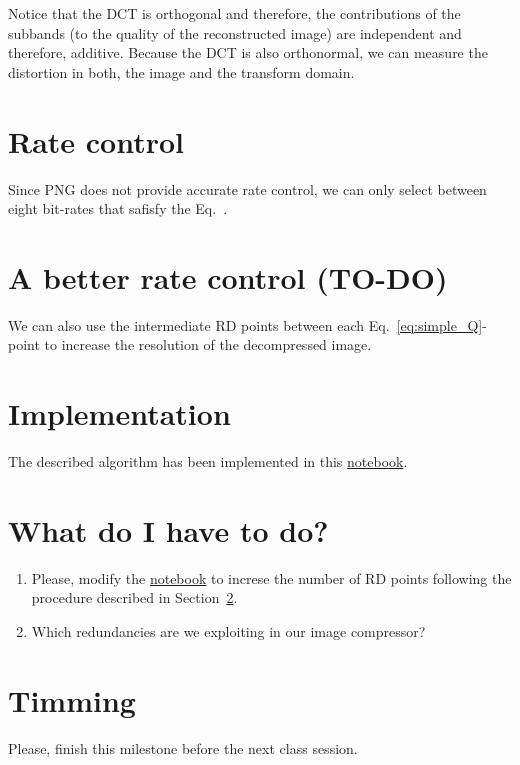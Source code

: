 Notice that the DCT is orthogonal and therefore, the contributions of
the subbands (to the quality of the reconstructed image) are
independent and therefore, additive. Because the DCT is also
orthonormal, we can measure the distortion in both, the image and the
transform domain.

\section{Rate control}
Since PNG does not provide accurate rate control, we can only select
between eight bit-rates that safisfy the Eq.~.

\section{A better rate control (TO-DO)}
\label{sec:increasing}
We can also use the intermediate RD points between each
Eq.~\eqref{eq:simple_Q}-point to increase the resolution of the
decompressed image.

\section{Implementation}
The described algorithm has been implemented in this
\href{https://github.com/Sistemas-Multimedia/Sistemas-Multimedia.github.io/blob/master/contents/RGB_DCT_SQ/RGB_DCT_SQ.ipynb}{notebook}.

\section{What do I have to do?}

\begin{enumerate}
\item Please, modify the
  \href{https://github.com/Sistemas-Multimedia/Sistemas-Multimedia.github.io/blob/master/contents/RGB_DCT_SQ/RGB_DCT_SQ.ipynb}{notebook}
  to increse the number of RD points following the procedure described
  in Section~\ref{sec:increasing}.
\item Which redundancies are we exploiting in our image compressor?
\end{enumerate}

\section{Timming}

Please, finish this milestone before the next class session.


